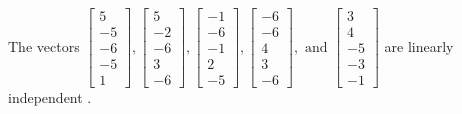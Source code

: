 \begin{exercise}
\begin{exerciseStatement}
  \end{exerciseStatement}
  \begin{exerciseAnswer}
   The vectors \(\left[\begin{array}{r}
5 \\
-5 \\
-6 \\
-5 \\
1
\end{array}\right] , \left[\begin{array}{r}
5 \\
-2 \\
-6 \\
3 \\
-6
\end{array}\right] , \left[\begin{array}{r}
-1 \\
-6 \\
-1 \\
2 \\
-5
\end{array}\right] , \left[\begin{array}{r}
-6 \\
-6 \\
4 \\
3 \\
-6
\end{array}\right] , \text{ and } \left[\begin{array}{r}
3 \\
4 \\
-5 \\
-3 \\
-1
\end{array}\right]\) are 
  	 linearly independent  .
  


  \end{exerciseAnswer}
\end{exercise}
